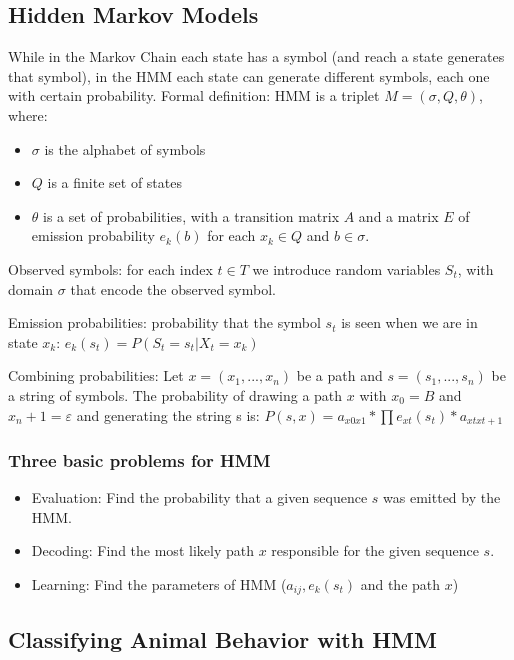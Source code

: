 \documentclass[main]{subfiles}
\begin{document}
\subsection{Hidden Markov Models}
While in the Markov Chain each state has a symbol (and reach a state generates that symbol),
in the HMM each state can generate different symbols, each one with certain probability.
Formal definition: HMM is a triplet $M = (\sigma, Q, \theta)$, where:
\begin{itemize}
\item $\sigma$ is the alphabet of symbols
\item $Q$ is a finite set of states
\item $\theta$ is a set of probabilities, with a transition matrix $A$
 and a matrix $E$ of emission probability $e_k (b)$ for each $x_k \in Q$ and $b \in \sigma$.
\end{itemize}

Observed symbols: for each index $t \in T$ we introduce random variables $S_t$,
with domain $\sigma$ that encode the observed symbol.

Emission probabilities: probability that the symbol $s_t$ is seen when we are in state $x_k$:
$e_k (s_t) = P(S_t = s_t | X_t = x_k)$

Combining probabilities: Let $x = (x_1, . . . , x_n)$ be a path and $s = (s_1, . . . , s_n)$ be a string of symbols.
The probability of drawing a path $x$ with $x_0 = B$ and $x_n+1 = \varepsilon$ and generating the string s is:
$P(s, x) = a_{x0x1} * \prod e_{xt}(s_t) * a_{xtxt+1}$

\subsubsection{Three basic problems for HMM}
\begin{itemize}
\item Evaluation: Find the probability that a given sequence $s$ was emitted by the HMM.
\item Decoding: Find the most likely path $x$ responsible for the given sequence $s$.
\item Learning: Find the parameters of HMM ($a_{ij}, e_{k}(s_{t})$ and the path $x$)
\end{itemize}

\subsection{Classifying Animal Behavior with HMM}
\end{document}
